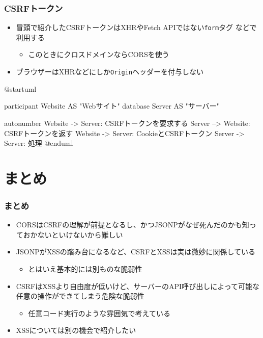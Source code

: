 \begin{frame}[fragile]
  \frametitle{CSRFトークン}

  \begin{itemize}
    \item 冒頭で紹介したCSRFトークンはXHRやFetch APIではない\lstinline|form|タグ
    などで利用する
    \begin{itemize}
      \item このときにクロスドメインならCORSを使う
    \end{itemize}

    \item ブラウザーはXHRなどにしか\lstinline|Origin|ヘッダーを付与しない
  \end{itemize}

  \begin{center}
    \begin{minipage}{.4\textwidth}
      \begin{plantuml}
        @startuml
        
        participant Website AS "Webサイト"
        database Server AS "サーバー"
     
        autonumber
        Website -> Server: CSRFトークンを要求する
        Server --> Website: CSRFトークンを返す
        Website -> Server: CookieとCSRFトークン
        Server -> Server: 処理
        @enduml
      \end{plantuml}
    \end{minipage}
  \end{center}
\end{frame}

\section{まとめ}

\begin{frame}
  \frametitle{まとめ}
  
  \begin{itemize}
    \item CORSはCSRFの理解が前提となるし、かつJSONPがなぜ死んだのかも知っておかないといけないから難しい

    \item JSONPがXSSの踏み台になるなど、CSRFとXSSは実は微妙に関係している
    \begin{itemize}
      \item とはいえ基本的には別ものな脆弱性
    \end{itemize}

    \item CSRFはXSSより自由度が低いけど、サーバーのAPI呼び出しによって可能な
    任意の操作ができてしまう危険な脆弱性
    \begin{itemize}
      \item 任意コード実行のような雰囲気で考えている
    \end{itemize}

    \item XSSについては別の機会で紹介したい
  \end{itemize}
\end{frame}

